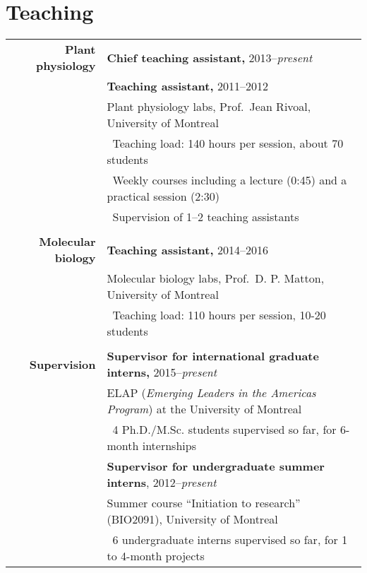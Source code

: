 \documentclass[letterpaper,10pt]{article}
\begin{document}
\bigskip
\bigskip

\section{Teaching}
\begin{tabular}{r|p{14cm}}

\textbf{Plant physiology} & \textbf{Chief teaching assistant,} 2013--\emph{present} \\
& \textbf{Teaching assistant,} 2011--2012 \\
& Plant physiology labs, Prof.~Jean Rivoal, University of Montreal
  \vspace{1mm} \\
& \textbullet{}~Teaching load: 140 hours per session, about 70 students \\
& \textbullet{}~Weekly courses including a lecture (0:45) and a practical
  session (2:30) \\
& \textbullet{}~Supervision of 1--2 teaching assistants \\

\multicolumn{2}{c}{} \\

\textbf{Molecular biology}
& \textbf{Teaching assistant,} 2014--2016 \\
& Molecular biology labs, Prof.~D. P. Matton, University of Montreal
  \vspace{1mm} \\
& \textbullet{}~Teaching load: 110 hours per session, 10-20 students \\

\multicolumn{2}{c}{} \\

\textbf{Supervision} & \textbf{Supervisor for international graduate interns,} 2015--\emph{present} \\
& ELAP (\emph{Emerging Leaders in the Americas Program})
  at the University of Montreal
  \vspace{1mm} \\
& \textbullet{}~4 Ph.D./M.Sc. students supervised so far, for 6-month
  internships
\vspace{2.5mm} \\

& \textbf{Supervisor for undergraduate summer interns}, 2012--\emph{present} \\
& Summer course ``Initiation to research'' (BIO2091), University of Montreal
  \vspace{1mm} \\
& \textbullet{}~6 undergraduate interns supervised so far, for 1 to
  4-month projects \\

\end{tabular}
\end{document}
